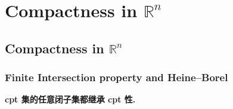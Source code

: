 \chapter{Compactness in \texorpdfstring{$\mathbb{R}^n$}{R n}}
\section{Compactness in \texorpdfstring{$\mathbb{R}^n$}{R n}}
\subsection{Finite Intersection property and Heine--Borel}
\begin{theorem}
    \textbf{cpt 集的任意闭子集都继承 cpt 性.}
\end{theorem}
